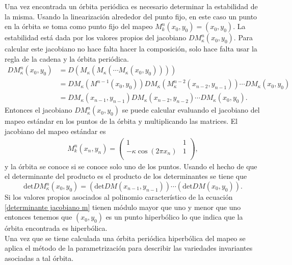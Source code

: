 Una vez encontrada un \'orbita peri\'odica es necesario determinar la estabilidad de la misma. Usando la linearizaci\'on alrededor del punto fijo, en este caso un punto en la \'orbita se toma como punto fijo  del mapeo  $M^{n}_{k}(x_{0},y_{0})=(x_{0},y_{0})$. La estabilidad est\'a dada por los valores propios del jacobiano $DM^{n}_{\kappa}(x_{0},y_{0})$. Para calcular este jacobiano no hace falta hacer la composici\'on, solo hace falta usar la regla de la cadena y la \'orbita peri\'odica.
\begin{align*}
DM^{n}_{\kappa}(x_{0},y_{0}) &= D(M_{\kappa}(M_{\kappa}(\cdots M_{\kappa}(x_{0},y_{0}))))\\
& = DM_{\kappa}(M^{n-1}(x_{0},y_{0}))DM_{\kappa}(M^{n-2}_{\kappa}(x_{n-2},y_{n-1}))\cdots DM_{\kappa}(x_{0},y_{0})\\
& = DM_{\kappa}(x_{n-1},y_{n-1})DM_{\kappa}(x_{n-2},y_{n-2})\cdots DM_{\kappa}(x_{0},y_{0}).
\end{align*}
Entonces el jacobiano $DM^{n}_{\kappa}(x_{0},y_{0})$ se puede calcular evaluando el jacobiano del mapeo est\'andar en los puntos de la \'orbita y multiplicando las matrices. El jacobiano del mapeo est\'andar es
\begin{eqnarray}
M^{n}_{k}(x_{n},y_{n})=\begin{pmatrix}
1 & 1 \\
- \kappa\cos(2\pi x_{n})& 1\\ 
\end{pmatrix},
\label{jacobiano mapeo}
\end{eqnarray}
y la \'orbita se conoce si se conoce solo uno de los puntos. Usando el hecho de que el determinante del producto es el producto de los determinantes se tiene que 
\begin{equation}
\textrm{det}DM^{n}_{\kappa}(x_{0},y_{0}) = \left(\textrm{det} DM(x_{n-1},y_{n-1})\right) \cdots \left(\textrm{det} DM(x_{0},y_{0})\right).
\label{determinante jacobiano m}
\end{equation} 
Si los valores propios asociados al polinomio caracter\'istico de la ecuaci\'on \eqref{determinante jacobiano m} tienen m\'odulo mayor que uno y menor que uno entonces tenemos que $(x_{0},y_{0})$ es un punto hiperb\'olico lo que indica que la \'orbita encontrada es hiperb\'olica. \\

Una vez que se tiene calculada una \'orbita peri\'odica hiperb\'olica del mapeo se aplica el m\'etodo de la parametrizaci\'on para describir las variedades invariantes asociadas a tal \'orbita. \\



